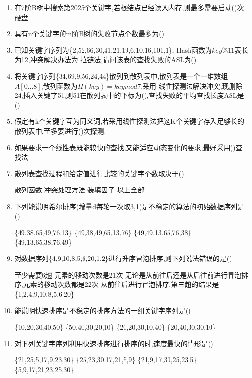 \documentclass[12pt, a4paper, oneside, UTF8]{ctexbook}
\begin{document}
\begin{enumerate}
    \item 在7阶B树中搜索第2025个关键字,若根结点已经读入内存,则最多需要启动(\qquad)次硬盘
    \item 具有n个关键字的m阶B树的失败节点个数最多为(\qquad)
    \item 已知关键字序列为\{2,52,66,30,41,21,19,6,10,16,101,1\}, Hash函数为$key \% 11$表长为12,冲突解决办法为
    拉链法,请问该表的查找失败的ASL为(\qquad)
    \item 将关键字序列\{34,69,9,56,24,44\}散列到散列表中,散列表是一个一维数组$A[0\ldots 8]$,散列函数为$H(key)=key mod 7$,采用
    线性探测法解决冲突,现删除24,插入关键字51,则51在散列表中的下标为(\qquad),查找失败的平均查找长度ASL是(\qquad)
    \item 假定有k个关键字互为同义词,若采用线性探测法把这K个关键字存入足够长的散列表中,至多要进行(\qquad)次探测.
    \item 如果要求一个线性表既能较快的查找,又能适应动态变化的要求,最好采用(\qquad)查找法
    \item 散列表查找过程和给定值进行比较的关键字个数取决于(\qquad)
    \begin{choices}
        \task 散列函数 \task 冲突处理方法 \task 装填因子 \task 以上全部
    \end{choices}
    \item 下列能说明希尔排序(增量d每轮一次取3,1)是不稳定的算法的初始数据序列是(\qquad)
    \begin{choices}[2]
        \task \{49,38,65,49,76,13\} \task \{49,38,49,65,13,76\}
        \task \{49,49,13,65,76,38\} \task \{49,13,65,38,76,49\}
    \end{choices}
    \item 对数据序列\{4,9,10,8,5,6,20,1,2\}进行升序冒泡排序,则下列说法错误的是(\qquad)
    \begin{choices}[1]
        \task 至少需要6趟
        \task 元素的移动次数是21次
        \task 无论是从前往后还是从后往前进行冒泡排序,元素的移动次数都是22次
        \task 从前往后进行冒泡排序,第三趟的结果是\{1,2,4,9,10,8,5,6,20\}
    \end{choices}
    \item 能说明快速排序是不稳定的排序方法的一组关键字序列是(\qquad)
    \begin{choices}[2]
        \task \{10,20,30,40,50\} \task \{50,40,30,20,10\}
        \task \{20,20,30,10,40\} \task \{20,40,30,30,10\}
    \end{choices}

    \item 对下列关键字序列利用快速排序进行排序的时,速度最快的情形是(\qquad)
    \begin{choices}[2]
        \task \{21,25,5,17,9,23,30\} \task \{25,23,30,17,21,5,9\}
        \task \{21,9,17,30,25,23,5\} \task \{5,9,17,21,23,25,30\}
    \end{choices}


\end{enumerate}
\end{document}
